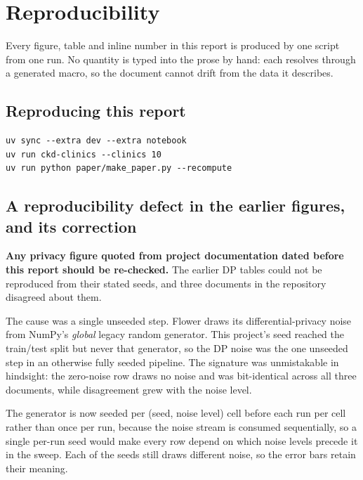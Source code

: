\appendix

\section{Reproducibility}
\label{sec:repro}

Every figure, table and inline number in this report is produced by one script from one run. No
quantity is typed into the prose by hand: each resolves through a generated macro, so the document
cannot drift from the data it describes.

\begin{center}

\end{center}

\subsection{Reproducing this report}

\begin{verbatim}
uv sync --extra dev --extra notebook
uv run ckd-clinics --clinics 10
uv run python paper/make_paper.py --recompute
\end{verbatim}

\subsection{A reproducibility defect in the earlier figures, and its correction}

\textbf{Any privacy figure quoted from project documentation dated before this report should be
re-checked.} The earlier DP tables could not be reproduced from their stated seeds, and three
documents in the repository disagreed about them.

The cause was a single unseeded step. Flower draws its differential-privacy noise from NumPy's
\emph{global} legacy random generator. This project's seed reached the train/test split but never
that generator, so the DP noise was the one unseeded step in an otherwise fully seeded pipeline. The
signature was unmistakable in hindsight: the zero-noise row draws no noise and was bit-identical
across all three documents, while disagreement grew with the noise level.

The generator is now seeded per (seed, noise level) cell before each run per cell rather than
once per run, because the noise stream is consumed sequentially, so a single per-run seed would make
every row depend on which noise levels precede it in the sweep. Each of the \NumSeeds{} seeds still
draws different noise, so the error bars retain their meaning.

